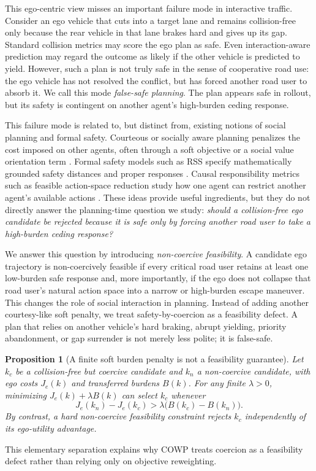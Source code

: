 \documentclass[10pt]{article}
\newtheorem{proposition}{Proposition}
\begin{document}
This ego-centric view misses an important failure mode in interactive traffic. Consider an ego vehicle that cuts into a target lane and remains collision-free only because the rear vehicle in that lane brakes hard and gives up its gap. Standard collision metrics may score the ego plan as safe. Even interaction-aware prediction may regard the outcome as likely if the other vehicle is predicted to yield. However, such a plan is not truly safe in the sense of cooperative road use: the ego vehicle has not resolved the conflict, but has forced another road user to absorb it. We call this mode \emph{false-safe planning}. The plan appears safe in rollout, but its safety is contingent on another agent's high-burden ceding response. 

This failure mode is related to, but distinct from, existing notions of social planning and formal safety. Courteous or socially aware planning penalizes the cost imposed on other agents, often through a soft objective or a social value orientation term \cite{sun2018courteous, schwarting2019social, crosato2022svo}. Formal safety models such as RSS specify mathematically grounded safety distances and proper responses \cite{shalev2017rss}. Causal responsibility metrics such as feasible action-space reduction study how one agent can restrict another agent's available actions \cite{george2023fear}. These ideas provide useful ingredients, but they do not directly answer the planning-time question we study: \emph{should a collision-free ego candidate be rejected because it is safe only by forcing another road user to take a high-burden ceding response?} 

We answer this question by introducing \emph{non-coercive feasibility}. A candidate ego trajectory is non-coercively feasible if every critical road user retains at least one low-burden safe response and, more importantly, if the ego does not collapse that road user's natural action space into a narrow or high-burden escape maneuver. This changes the role of social interaction in planning. Instead of adding another courtesy-like soft penalty, we treat safety-by-coercion as a feasibility defect. A plan that relies on another vehicle's hard braking, abrupt yielding, priority abandonment, or gap surrender is not merely less polite; it is false-safe. 

\begin{proposition}[A finite soft burden penalty is not a feasibility guarantee]
Let $k_c$ be a collision-free but coercive candidate and $k_n$ a non-coercive candidate, with ego costs $J_e(k)$ and transferred burdens $B(k)$. For any finite $\lambda>0$, minimizing $J_e(k)+\lambda B(k)$ can select $k_c$ whenever
\begin{equation}
    J_e(k_n)-J_e(k_c)>\lambda\bigl(B(k_c)-B(k_n)\bigr).
\end{equation}
By contrast, a hard non-coercive feasibility constraint rejects $k_c$ independently of its ego-utility advantage.
\end{proposition}
\noindent This elementary separation explains why COWP treats coercion as a feasibility defect rather than relying only on objective reweighting.
\end{document}
